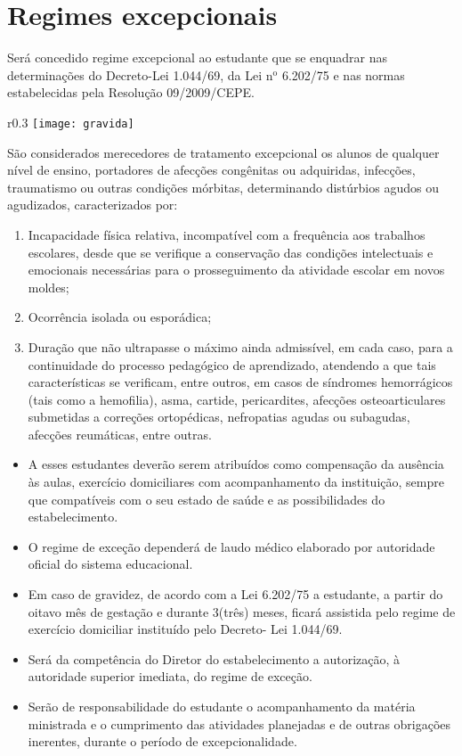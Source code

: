 \section{Regimes excepcionais}

Será concedido regime excepcional ao estudante que se enquadrar nas determinações do Decreto-Lei 1.044/69, da Lei n$^{\mbox{o}}$ 6.202/75 e nas normas estabelecidas pela Resolução 09/2009/CEPE.

\begin{wrapfigure}{r}{0.3\textwidth}
        \centering
        \texttt{[image: gravida]}
    \end{wrapfigure}
São considerados merecedores de tratamento excepcional os alunos de qualquer nível de ensino, portadores de afecções congênitas ou adquiridas, infecções, traumatismo ou outras condições mórbitas, determinando distúrbios agudos ou agudizados, caracterizados por: 

    \begin{enumerate}
    
        \item Incapacidade física relativa, incompatível com a frequência aos trabalhos escolares, desde que se verifique a conservação das condições intelectuais e emocionais necessárias para o prosseguimento da atividade escolar em novos moldes;
        \item Ocorrência isolada ou esporádica;
        \item Duração que não ultrapasse o máximo ainda admissível, em cada caso, para a continuidade do processo pedagógico de aprendizado, atendendo a que tais características se verificam, entre outros, em casos de síndromes hemorrágicos (tais como a hemofilia), asma, cartide, pericardites, afecções osteoarticulares submetidas a correções ortopédicas, nefropatias agudas ou subagudas, afecções reumáticas, entre outras.
    \end{enumerate}

\begin{itemize}
    \item A esses estudantes deverão serem atribuídos como compensação da ausência às aulas, exercício domiciliares com acompanhamento da instituição, sempre que compatíveis com o seu estado de saúde e as possibilidades do estabelecimento.
    \item O regime de exceção dependerá de laudo médico elaborado por autoridade oficial do sistema educacional. 
    \item Em caso de gravidez, de acordo com a Lei 6.202/75 a estudante,
a partir do oitavo mês de gestação e
durante 3(três) meses, ficará assistida pelo regime
de exercício domiciliar instituído pelo Decreto-
Lei 1.044/69. 
    \item Será da competência do Diretor do estabelecimento a autorização, à autoridade superior imediata, do regime de exceção.
    \item Serão de responsabilidade do estudante o acompanhamento da matéria ministrada e o cumprimento das atividades planejadas e de outras obrigações inerentes, durante o período de excepcionalidade. 
\end{itemize}

